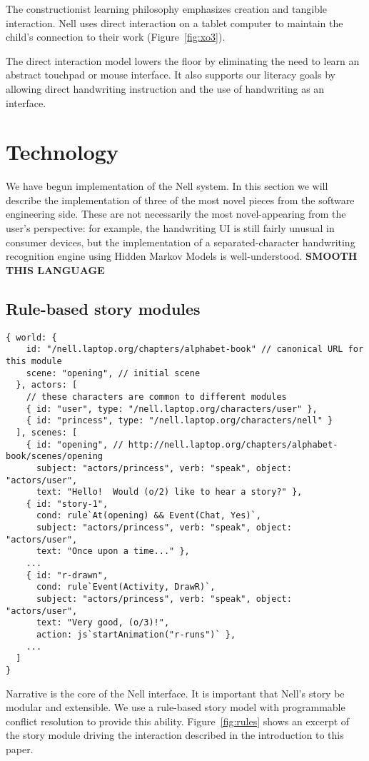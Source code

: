 \documentclass{acm_proc_article-sp}
\begin{document}
The constructionist learning philosophy emphasizes creation and
tangible interaction.  Nell uses direct interaction on a tablet
computer to maintain the child's connection to their work
(Figure~\ref{fig:xo3}).

The direct interaction model lowers the floor by eliminating the need
to learn an abstract touchpad or mouse interface.  It also supports
our literacy goals by allowing direct handwriting instruction and the
use of handwriting as an interface.

\section{Technology}
We have begun implementation of the Nell system.  In this section we
will describe the implementation of three of the most novel pieces
from the software engineering side.  These are not necessarily the
most novel-appearing from the user's perspective: for example, the
handwriting UI is still fairly unusual in consumer devices, but the
implementation of a separated-character handwriting recognition engine
using Hidden Markov Models is well-understood.
\textbf{SMOOTH THIS LANGUAGE}

\subsection{Rule-based story modules}
\begin{figure*}
\begin{verbatim}
{ world: {
    id: "/nell.laptop.org/chapters/alphabet-book" // canonical URL for this module
    scene: "opening", // initial scene
  }, actors: [
    // these characters are common to different modules
    { id: "user", type: "/nell.laptop.org/characters/user" },
    { id: "princess", type: "/nell.laptop.org/characters/nell" }
  ], scenes: [
    { id: "opening", // http://nell.laptop.org/chapters/alphabet-book/scenes/opening
      subject: "actors/princess", verb: "speak", object: "actors/user",
      text: "Hello!  Would (o/2) like to hear a story?" },
    { id: "story-1",
      cond: rule`At(opening) && Event(Chat, Yes)`,
      subject: "actors/princess", verb: "speak", object: "actors/user",
      text: "Once upon a time..." },
    ...
    { id: "r-drawn",
      cond: rule`Event(Activity, DrawR)`,
      subject: "actors/princess", verb: "speak", object: "actors/user",
      text: "Very good, (o/3)!",
      action: js`startAnimation("r-runs")` },
    ...
  ]
}
\end{verbatim}
\caption{Excerpt of JSON-formatted story module.  Some details (format
  versioning, etc) have been elided).}\label{fig:rules}
\end{figure*}
Narrative is the core of the Nell interface.  It is important that
Nell's story be modular and extensible.  We use a rule-based story
model with programmable conflict resolution to provide this ability.
Figure~\ref{fig:rules} shows an excerpt of the story module driving
the interaction described in the introduction to this paper.
\end{document}
